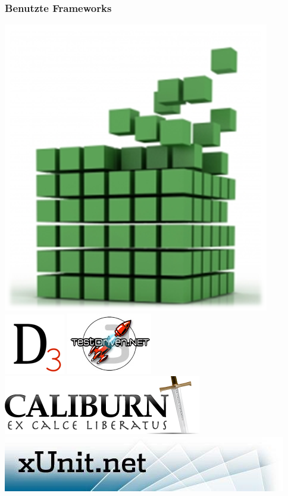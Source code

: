 \documentclass[t]{beamer}
\begin{document}
\begin{frame}
    \frametitle{Benutzte Frameworks}
    \includegraphics[scale=0.1]{img/mef} \hspace{0.1cm}
    \includegraphics[scale=0.4]{img/d3} \hspace{0.1cm}
    \includegraphics[scale=0.4]{img/td} \hspace{0.5cm}
    \includegraphics[scale=0.4]{img/caliburn} ~\\
    \vspace{0.5cm} \hspace{0.6cm} \includegraphics[scale=0.45]{img/xunit} \hspace{0.7cm}

\end{frame}
\end{document}
